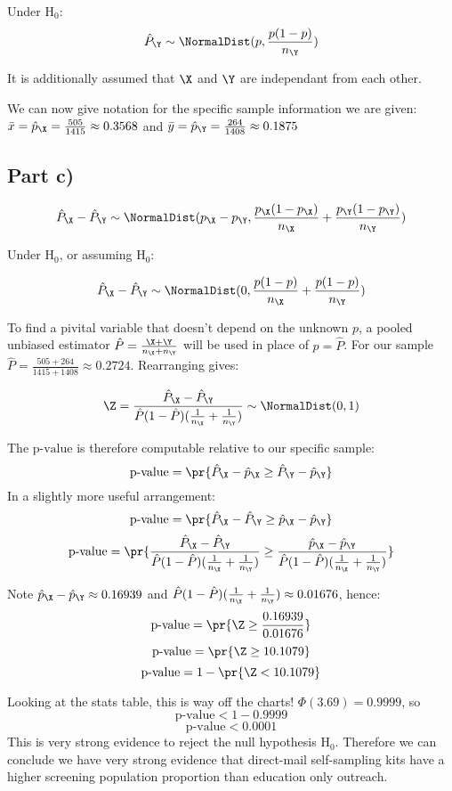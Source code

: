 Under $\text{H}_0$:
\[
\hat{P}_\Y \sim \NormalDist (p, \frac{p (1 - p)}{n_\Y})
\]

It is additionally assumed that $\X$ and $\Y$ are independant from each other.

We can now give notation for the specific sample information we are given:
$\bar{x} = \hat{p}_\X = \frac{505}{1415} \approx 0.3568$ and $\bar{y} = \hat{p}_\Y = \frac{264}{1408} \approx 0.1875$

\subsection{Part c)}

\[
\hat{P}_\X - \hat{P}_\Y \sim \NormalDist (p_\X - p_\Y, \frac{p_\X(1-p_\X)}{n_\X} + \frac{p_\Y(1-p_\Y)}{n_\Y})
\]

Under $\text{H}_0$, or assuming $\text{H}_0$:

\[
\hat{P}_\X - \hat{P}_\Y \sim \NormalDist (0, \frac{p(1-p)}{n_\X} + \frac{p(1-p)}{n_\Y})
\]

To find a pivital variable that doesn't depend on the unknown $p$, a pooled unbiased estimator $\hat{P} = \frac{\X + \Y}{n_\X + n_\Y}$
will be used in place of $p = \hat{P}$. For our sample $\hat{P} = \frac{505 + 264}{1415 + 1408} \approx 0.2724$. Rearranging gives:

\[
\Z = \frac{\hat{P}_\X - \hat{P}_\Y}{\hat{P}(1 - \hat{P})(\frac{1}{n_\X} + \frac{1}{n_\Y})} \sim \NormalDist(0, 1)
\]

The $\text{p-value}$ is therefore computable relative to our specific sample:
\[
\text{p-value} = \pr{\hat{P}_\X - \hat{p}_\X \geq \hat{P}_\Y - \hat{p}_\Y}
\]
In a slightly more useful arrangement:
\[
\text{p-value} = \pr{\hat{P}_\X - \hat{P}_\Y \geq \hat{p}_\X - \hat{p}_\Y}
\]
\[
\text{p-value} = \pr{
	\frac{\hat{P}_\X - \hat{P}_\Y}{\hat{P}(1 - \hat{P})(\frac{1}{n_\X} + \frac{1}{n_\Y})}
	\geq
	\frac{\hat{p}_\X - \hat{p}_\Y}{\hat{P}(1 - \hat{P})(\frac{1}{n_\X} + \frac{1}{n_\Y})}
}
\]

Note $\hat{p}_\X - \hat{p}_\Y \approx 0.16939$ and $\hat{P}(1 - \hat{P})(\frac{1}{n_\X} + \frac{1}{n_\Y}) \approx 0.01676$, hence:
\[
\text{p-value} = \pr{ \Z \geq \frac{0.16939}{0.01676}}
\]
\[
\text{p-value} = \pr{ \Z \geq 10.1079}
\]
\[
\text{p-value} = 1 - \pr{ \Z < 10.1079}
\]

Looking at the stats table, this is way off the charts! $\Phi(3.69) = 0.9999$, so
\[
\text{p-value} < 1 - 0.9999
\]
\[
\text{p-value} < 0.0001
\]
This is very strong evidence to reject the null hypothesis $\text{H}_0$.
Therefore we can conclude we have very strong evidence that direct-mail self-sampling kits have a higher screening population proportion than
education only outreach.

